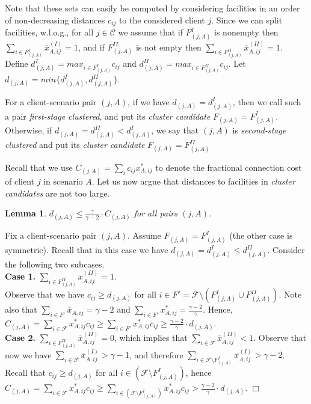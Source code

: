 \documentclass[11pt]{article}
\newtheorem{lemma}[theorem]{Lemma}
\newcommand{\qed}{\nopagebreak \hfill $\Box$}
\newenvironment{proof}{\par \noindent {\em Proof:}}{\qed \par}
\newcommand{\C}{\mathcal{C}}
\newcommand{\F}{\mathcal{F}}
\begin{document}
Note that  these sets can easily be computed by considering facilities in an order of non-decreasing distances $c_{ij}$
to the considered client $j$.
Since we can split facilities, w.l.o.g., for all $j \in \C$ we assume that if $F_{(j,A)}^{I}$ is nonempty then
$\sum_{i \in F_{(j,A)}^{I}} \overline{x}^{(I)}_{A,ij} = 1$, and if $F_{(j,A)}^{II}$ is not empty then
$\sum_{i \in F_{(j,A)}^{II}} \overline{x}^{(II)}_{A,ij} = 1$.
Define $d_{(j,A)}^I = max_{i \in F_{(j,A)}^I} c_{ij}$ and $d_{(j,A)}^{II} = max_{i \in F_{(j,A)}^{II}} c_{ij}$.
Let $d_{(j,A)} = min\{d_{(j,A)}^I, d_{(j,A)}^{II}\}$.

For a client-scenario pair $(j,A)$, if we have $d_{(j,A)} = d_{(j,A)}^I$, then we call such a pair \emph{first-stage clustered},
and put its \emph{cluster candidate} $F_{(j,A)} = F_{(j,A)}^I$. Otherwise, if $d_{(j,A)} = d_{(j,A)}^{II} < d_{(j,A)}^{I}$, 
we say that $(j,A)$ is \emph{second-stage clustered} and put its \emph{cluster candidate} $F_{(j,A)} = F_{(j,A)}^{II}$

Recall that we use $C_{(j,A)}=\sum_i c_{ij} x^*_{A,ij}$ to denote the fractional connection cost of client $j$ in scenario $A$.
Let us now argue that distances to facilities in \emph{cluster candidates} are not too large. 

\begin{lemma} \label{lemma:d_j_A}
 $d_{(j,A)} \leq \frac{\gamma}{\gamma-2} \cdot C_{(j,A)}$ for all pairs $(j,A)$. 
\end{lemma}

\begin{proof}
Fix a client-scenario pair $(j,A)$. Assume $F_{(j,A)} = F_{(j,A)}^I$ (the other case is symmetric).
Recall that in this case we have $d_{(j,A)} = d_{(j,A)}^I \leq d_{(j,A)}^{II}$.
Consider the following two subcases.\\
\textbf{Case 1.} $\sum_{i \in F_{(j,A)}^{II}} \overline{x}^{(II)}_{A,ij} = 1$.\\
Observe that we have $c_{ij} \geq d_{(j,A)}$ for all $i \in F'=\F\setminus (F_{(j,A)}^I \cup F_{(j,A)}^{II})$.
Note also that $\sum_{i \in F'} \overline{x}_{A,ij} = \gamma - 2$ and
$\sum_{i \in F'} x^*_{A,ij} = \frac{\gamma - 2}{\gamma}$. 
Hence, $C_{(j,A)}=\sum_{i \in \F} x^*_{A,ij} c_{ij} \geq \sum_{i \in F'} x^*_{A,ij} c_{ij} \geq \frac{\gamma - 2}{\gamma} \cdot d_{(j,A)}$.\\
\textbf{Case 2.} $\sum_{i \in F_{(j,A)}^{II}} \overline{x}^{(II)}_{A,ij} = 0$, which implies that 
$\sum_{i \in \F} \overline{x}^{(II)}_{A,ij} < 1$. Observe that now we have $\sum_{i \in \F} \overline{x}^{(I)}_{A,ij}  > \gamma - 1$,
and therefore $\sum_{i \in \F \setminus F_{(j,A)}^I} \overline{x}^{(I)}_{A,ij} > \gamma-2$.
Recall that $c_{ij} \geq d_{(j,A)}$ for all $i \in (\F\setminus F_{(j,A)}^I) $, hence
$C_{(j,A)} = \sum_{i \in \F} x^*_{A,ij} c_{ij} \geq \sum_{i \in (\F\setminus F_{(j,A)}^I)} x^*_{A,ij} c_{ij} > 
\frac{\gamma - 2}{\gamma} \cdot d_{(j,A)}$. 
\end{proof}
 
\end{document}
